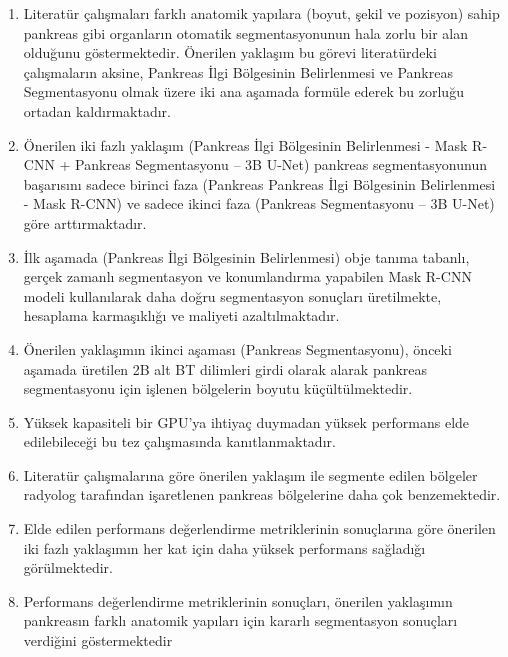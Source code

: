 \begin{enumerate}
	\item Literatür çalışmaları farklı anatomik yapılara (boyut, şekil ve pozisyon) sahip pankreas gibi organların otomatik segmentasyonunun hala zorlu bir alan olduğunu göstermektedir. Önerilen yaklaşım bu görevi literatürdeki çalışmaların aksine, Pankreas İlgi Bölgesinin Belirlenmesi ve Pankreas Segmentasyonu olmak üzere iki ana aşamada formüle ederek bu zorluğu ortadan kaldırmaktadır.
	
	\item Önerilen iki fazlı yaklaşım (Pankreas İlgi Bölgesinin Belirlenmesi - Mask R-CNN + Pankreas Segmentasyonu – 3B U-Net) pankreas segmentasyonunun başarısını sadece birinci faza (Pankreas Pankreas İlgi Bölgesinin Belirlenmesi - Mask R-CNN) ve sadece ikinci faza (Pankreas Segmentasyonu – 3B U-Net) göre arttırmaktadır. 
	
    \item İlk aşamada (Pankreas İlgi Bölgesinin Belirlenmesi) obje tanıma tabanlı, gerçek zamanlı segmentasyon ve konumlandırma yapabilen Mask R-CNN modeli kullanılarak daha doğru segmentasyon sonuçları üretilmekte, hesaplama karmaşıklığı ve maliyeti azaltılmaktadır.
    
    \item Önerilen yaklaşımın ikinci aşaması (Pankreas Segmentasyonu), önceki aşamada üretilen 2B alt BT dilimleri girdi olarak alarak pankreas segmentasyonu için işlenen bölgelerin boyutu küçültülmektedir.
    
    \item Yüksek kapasiteli bir GPU'ya ihtiyaç duymadan yüksek performans elde edilebileceği bu tez çalışmasında kanıtlanmaktadır.

    \item Literatür çalışmalarına göre önerilen yaklaşım ile segmente edilen bölgeler radyolog tarafından işaretlenen pankreas bölgelerine daha çok benzemektedir.

    \item Elde edilen performans değerlendirme metriklerinin sonuçlarına göre önerilen iki fazlı yaklaşımın her kat için daha yüksek performans sağladığı görülmektedir. 

    \item Performans değerlendirme metriklerinin sonuçları, önerilen yaklaşımın pankreasın farklı anatomik yapıları için kararlı segmentasyon sonuçları verdiğini göstermektedir

\end{enumerate}

